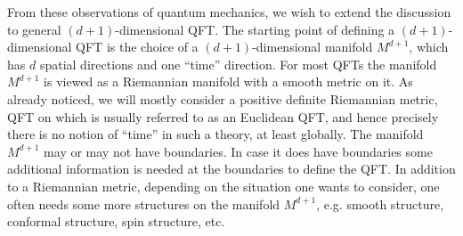 From these observations of quantum mechanics, we wish to extend the
discussion to general $(d+1)$-dimensional QFT. The starting point
of defining a $(d+1)$-dimensional QFT is the choice of a $(d+1)$-dimensional
manifold $M^{d+1}$, which has $d$ spatial directions and one ``time''
direction. For most QFTs the manifold $M^{d+1}$ is viewed as a Riemannian
manifold with a smooth metric on it. As already noticed, we will mostly
consider a positive definite Riemannian metric, QFT on which is usually
referred to as an Euclidean QFT, and hence precisely there is no notion
of ``time'' in such a theory, at least globally. The manifold $M^{d+1}$
may or may not have boundaries. In case it does have boundaries some
additional information is needed at the boundaries to define the QFT.
In addition to a Riemannian metric, depending on the situation one
wants to consider, one often needs some more structures on the manifold
$M^{d+1}$, e.g. smooth structure, conformal structure, spin structure,
etc.

